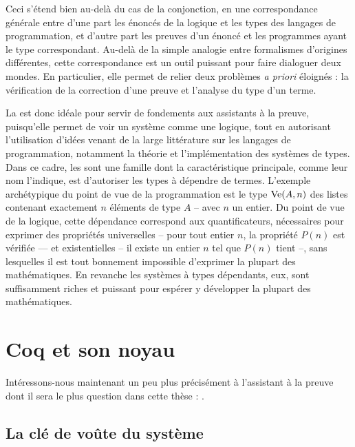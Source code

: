Ceci s’étend bien au-delà du cas de la conjonction,
en une correspondance générale entre d’une part les énoncés de la logique et les types des langages de programmation, et d’autre part les preuves d’un énoncé et les programmes ayant le type correspondant.
Au-delà de la simple analogie entre formalismes d’origines différentes, cette correspondance est un outil puissant pour faire dialoguer deux mondes.
En particulier, elle permet de relier deux problèmes \textit{a priori} éloignés :
la vérification de la correction d’une preuve et l’analyse du type d’un terme.

La  est donc idéale pour servir de fondements aux
assistants à la preuve, puisqu’elle permet de voir un système
comme une logique, tout en autorisant l’utilisation d’idées venant de
la large littérature sur les langages de programmation, notamment
la théorie et l’implémentation des systèmes de types.
Dans ce cadre, les  sont une famille dont
la caractéristique principale, comme leur nom l’indique, est d’autoriser les
types à dépendre de termes. L’exemple archétypique du point de vue de la 
programmation est le type
$\operatorname{Ve}(A,n)$ des listes contenant exactement $n$ éléments
de type $A$ – avec $n$ un entier.
Du point de vue de la logique, cette
dépendance correspond aux quantificateurs, nécessaires pour exprimer des
propriétés universelles – pour tout entier $n$, la propriété $P(n)$ est
vérifiée — et existentielles – il existe un entier $n$ tel que $P(n)$ tient –,
sans lesquelles il est tout bonnement impossible d’exprimer la plupart des
mathématiques. En revanche les systèmes à types dépendants, eux, sont suffisamment
riches et puissant pour espérer y développer la plupart des mathématiques.

\section{Coq et son noyau}
\label{sec:intro-coq}

Intéressons-nous maintenant un peu plus précisément à l’assistant à la
preuve dont il sera le plus question dans cette thèse : .

\subsection{La clé de voûte du système}


